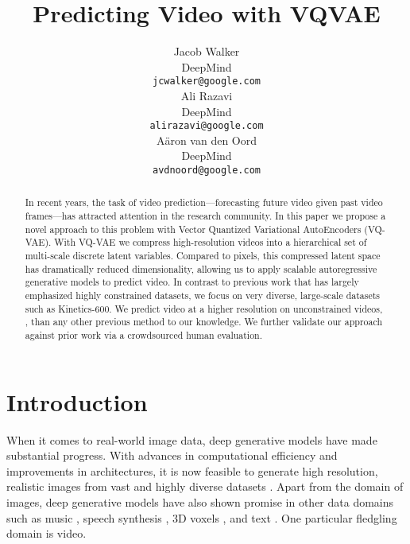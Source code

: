 \documentclass{article}
\title{Predicting Video with VQVAE}
\author{
   Jacob Walker \\
   DeepMind \\
   \texttt{jcwalker@google.com} \\
   \And
   Ali Razavi \\
   DeepMind \\
   \texttt{alirazavi@google.com} \\
   \And
   Aäron van den Oord \\
   DeepMind \\
   \texttt{avdnoord@google.com} \\
}
\begin{document}
\maketitle

\begin{abstract}
  In recent years, the task of video prediction---forecasting future video given past video frames---has attracted attention in the research community. In this paper we propose a novel approach to this problem with Vector Quantized Variational AutoEncoders (VQ-VAE). With VQ-VAE we compress high-resolution videos into a hierarchical set of multi-scale discrete latent variables. Compared to pixels, this compressed latent space has dramatically reduced dimensionality, allowing us to apply scalable autoregressive generative models to predict video. In contrast to previous work that has largely emphasized highly constrained datasets, we focus on very diverse, large-scale datasets such as Kinetics-600. We predict video at a higher resolution on unconstrained videos, , than any other previous method to our knowledge. We further validate our approach against prior work via a crowdsourced human evaluation.

  
\end{abstract}

\section{Introduction}
When it comes to real-world image data, deep generative models have made substantial progress. With advances in computational efficiency and improvements in architectures, it is now feasible to generate high resolution, realistic images from vast and highly diverse datasets \cite{BrockDS19, RazaviOV19, karras2017progressive}. Apart from the domain of images, deep generative models have also shown promise in other data domains such as music \cite{DielemanOS18, jukebox}, speech synthesis \cite{oord2016wavenet}, 3D voxels \cite{LiuGO18, NashW17}, and text \cite{radford2019language}. One particular fledgling domain is video.
\end{document}
